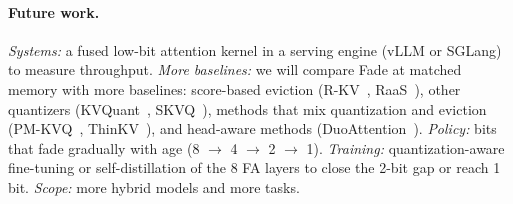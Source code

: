 \documentclass{article}
\begin{document}
\paragraph{Future work.} \emph{Systems:} a fused low-bit attention kernel in a serving engine (vLLM or SGLang) to measure throughput. \emph{More baselines:} we will compare Fade at matched memory with more baselines: score-based eviction (R-KV~\cite{rkv}, RaaS~\cite{raas}), other quantizers (KVQuant~\cite{kvquant}, SKVQ~\cite{skvq}), methods that mix quantization and eviction (PM-KVQ~\cite{pmkvq}, ThinKV~\cite{thinkv}), and head-aware methods (DuoAttention~\cite{duoattention}). \emph{Policy:} bits that fade gradually with age (8 $\to$ 4 $\to$ 2 $\to$ 1). \emph{Training:} quantization-aware fine-tuning or self-distillation of the 8 FA layers to close the 2-bit gap or reach 1 bit. \emph{Scope:} more hybrid models and more tasks.
\end{document}
